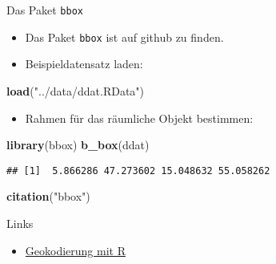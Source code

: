 \documentclass[ignorenonframetext,]{beamer}
\newenvironment{Shaded}{\begin{snugshade}}{\end{snugshade}}
\newcommand{\KeywordTok}[1]{\textcolor[rgb]{0.13,0.29,0.53}{\textbf{#1}}}
\newcommand{\NormalTok}[1]{#1}
\newcommand{\StringTok}[1]{\textcolor[rgb]{0.31,0.60,0.02}{#1}}
\providecommand{\tightlist}{%
  \setlength{\itemsep}{0pt}\setlength{\parskip}{0pt}}
\begin{document}
\begin{frame}[fragile]{Das Paket \texttt{bbox}}
\protect\hypertarget{das-paket-bbox}{}

\begin{itemize}
\item
  Das Paket \texttt{bbox} ist auf github zu finden.
\item
  Beispieldatensatz laden:
\end{itemize}

\begin{Shaded}
\begin{Highlighting}[]
\KeywordTok{load}\NormalTok{(}\StringTok{"../data/ddat.RData"}\NormalTok{)}
\end{Highlighting}
\end{Shaded}

\begin{itemize}
\tightlist
\item
  Rahmen für das räumliche Objekt bestimmen:
\end{itemize}

\begin{Shaded}
\begin{Highlighting}[]
\KeywordTok{library}\NormalTok{(bbox)}
\KeywordTok{b_box}\NormalTok{(ddat)}
\end{Highlighting}
\end{Shaded}

\begin{verbatim}
## [1]  5.866286 47.273602 15.048632 55.058262
\end{verbatim}

\begin{Shaded}
\begin{Highlighting}[]
\KeywordTok{citation}\NormalTok{(}\StringTok{"bbox"}\NormalTok{)}
\end{Highlighting}
\end{Shaded}

\end{frame}

\begin{frame}{Links}
\protect\hypertarget{links}{}

\begin{itemize}
\tightlist
\item
  \href{https://www.jessesadler.com/post/geocoding-with-r/}{Geokodierung
  mit R}
\end{itemize}

\end{frame}
\end{document}
